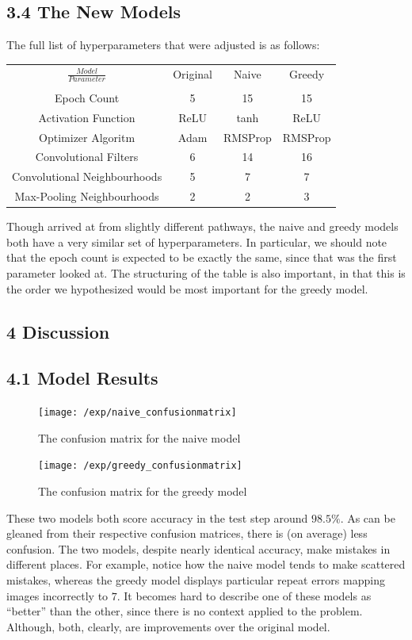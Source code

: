 \documentclass{article}
\begin{document}
\pagebreak
\subsection*{3.4 The New Models}
The full list of hyperparameters that were adjusted is as follows:
\begin{center}
\begin{tabular}{|c|c|c|c|}
\hline
$\frac{Model}{Parameter}$ & Original & Naive & Greedy\\
 & & & \\
Epoch Count & 5 & 15 & 15\\
Activation Function & ReLU & tanh & ReLU\\
Optimizer Algoritm & Adam & RMSProp & RMSProp\\
Convolutional Filters & 6 & 14 & 16\\
Convolutional Neighbourhoods & 5 & 7 & 7\\
Max-Pooling Neighbourhoods & 2 & 2 & 3\\
\hline
\end{tabular}
\end{center}
Though arrived at from slightly different pathways, the naive and greedy models both have a very similar set of hyperparameters. In particular, we should note that the epoch count is expected to be exactly the same, since that was the first parameter looked at. The structuring of the table is also important, in that this is the order we hypothesized would be most important for the greedy model.
\subsection*{4 Discussion}
\subsection*{4.1 Model Results}
\begin{figure}[H]
\texttt{[image: /exp/naive\_confusionmatrix]}
\caption{The confusion matrix for the naive model}
\end{figure}
\begin{figure}[H]
\texttt{[image: /exp/greedy\_confusionmatrix]}
\caption{The confusion matrix for the greedy model}
\end{figure}
These two models both score accuracy in the test step around $98.5\%$. As can be gleaned from their respective confusion matrices, there is (on average) less confusion. The two models, despite nearly identical accuracy, make mistakes in different places. For example, notice how the naive model tends to make scattered mistakes, whereas the greedy model displays particular repeat errors mapping images incorrectly to $7$. It becomes hard to describe one of these models as ``better'' than the other, since there is no context applied to the problem. Although, both, clearly, are improvements over the original model.
\end{document}
